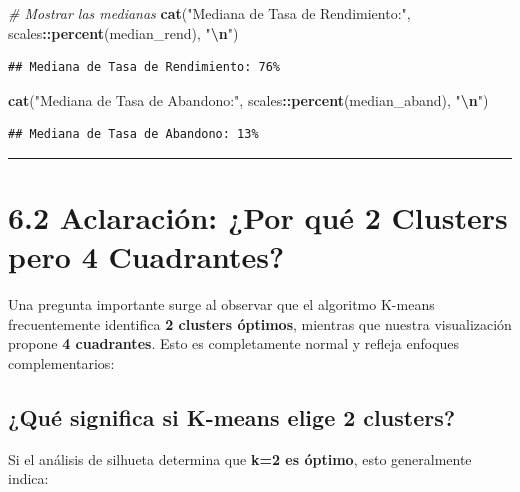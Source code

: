 \documentclass[
]{article}
\newenvironment{Shaded}{\begin{snugshade}}{\end{snugshade}}
\newcommand{\CommentTok}[1]{\textcolor[rgb]{0.56,0.35,0.01}{\textit{#1}}}
\newcommand{\FunctionTok}[1]{\textcolor[rgb]{0.13,0.29,0.53}{\textbf{#1}}}
\newcommand{\NormalTok}[1]{#1}
\newcommand{\SpecialCharTok}[1]{\textcolor[rgb]{0.81,0.36,0.00}{\textbf{#1}}}
\newcommand{\StringTok}[1]{\textcolor[rgb]{0.31,0.60,0.02}{#1}}
\begin{document}
\begin{Shaded}
\begin{Highlighting}[]
\CommentTok{\# Mostrar las medianas}
\FunctionTok{cat}\NormalTok{(}\StringTok{"Mediana de Tasa de Rendimiento:"}\NormalTok{, scales}\SpecialCharTok{::}\FunctionTok{percent}\NormalTok{(median\_rend), }\StringTok{"}\SpecialCharTok{\textbackslash{}n}\StringTok{"}\NormalTok{)}
\end{Highlighting}
\end{Shaded}

\begin{verbatim}
## Mediana de Tasa de Rendimiento: 76%
\end{verbatim}

\begin{Shaded}
\begin{Highlighting}[]
\FunctionTok{cat}\NormalTok{(}\StringTok{"Mediana de Tasa de Abandono:"}\NormalTok{, scales}\SpecialCharTok{::}\FunctionTok{percent}\NormalTok{(median\_aband), }\StringTok{"}\SpecialCharTok{\textbackslash{}n}\StringTok{"}\NormalTok{)}
\end{Highlighting}
\end{Shaded}

\begin{verbatim}
## Mediana de Tasa de Abandono: 13%
\end{verbatim}

\begin{center}\rule{0.5\linewidth}{0.5pt}\end{center}

\section{6.2 Aclaración: ¿Por qué 2 Clusters pero 4
Cuadrantes?}\label{aclaraciuxf3n-por-quuxe9-2-clusters-pero-4-cuadrantes}

Una pregunta importante surge al observar que el algoritmo K-means
frecuentemente identifica \textbf{2 clusters óptimos}, mientras que
nuestra visualización propone \textbf{4 cuadrantes}. Esto es
completamente normal y refleja enfoques complementarios:

\subsection{¿Qué significa si K-means elige 2
clusters?}\label{quuxe9-significa-si-k-means-elige-2-clusters}

Si el análisis de silhueta determina que \textbf{k=2 es óptimo}, esto
generalmente indica:
\end{document}
